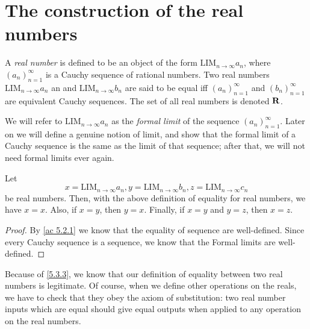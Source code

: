 \section{The construction of the real numbers}\label{sec 5.3}

\begin{definition}\label{5.3.1}
  A \emph{real number} is defined to be an object of the form \(\text{LIM}_{n \to \infty} a_n\), where \((a_n)_{n = 1}^{\infty}\) is a Cauchy sequence of rational numbers.
  Two real numbers \(\text{LIM}_{n \to \infty} a_n\) an and \(\text{LIM}_{n \to \infty} b_n\) are said to be equal iff \((a_n)_{n = 1}^{\infty}\) and \((b_n)_{n = 1}^{\infty}\) are equivalent Cauchy sequences.
  The set of all real numbers is denoted \(\mathbf{R}\).
\end{definition}

\begin{note}
  We will refer to \(\text{LIM}_{n \to \infty} a_n\) as the \emph{formal limit} of the sequence \((a_n)_{n = 1}^{\infty}\).
  Later on we will define a genuine notion of limit, and show that the formal limit of a Cauchy sequence is the same as the limit of that sequence;
  after that, we will not need formal limits ever again.
\end{note}

\setcounter{theorem}{2}
\begin{proposition}\label{5.3.3}
  Let
  \[
    x = \text{LIM}_{n \to \infty} a_n, y = \text{LIM}_{n \to \infty} b_n, z = \text{LIM}_{n \to \infty} c_n
  \]
  be real numbers.
  Then, with the above definition of equality for real numbers, we have \(x = x\).
  Also, if \(x = y\), then \(y = x\).
  Finally, if \(x = y\) and \(y = z\), then \(x = z\).
\end{proposition}

\begin{proof}
  By \cref{ac 5.2.1} we know that the equality of sequence are well-defined.
  Since every Cauchy sequence is a sequence, we know that the Formal limits are well-defined.
\end{proof}

\begin{note}
  Because of \cref{5.3.3}, we know that our definition of equality between two real numbers is legitimate.
  Of course, when we define other operations on the reals, we have to check that they obey the axiom of substitution:
  two real number inputs which are equal should give equal outputs when applied to any operation on the real numbers.
\end{note}

